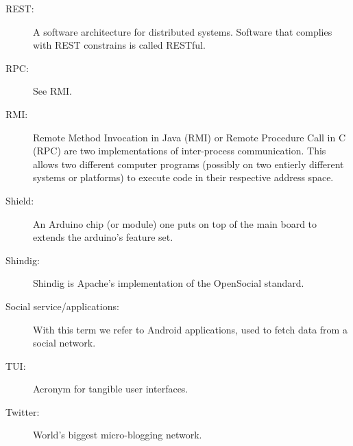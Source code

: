 \begin{description}
\item[REST:]
	A software architecture for distributed systems. Software that complies with REST constrains is called RESTful.
\item[RPC:]
	See RMI.
\item[RMI:]
	Remote Method Invocation in Java (RMI) or Remote Procedure Call in C (RPC) are two implementations of inter-process communication.
	This allows two different computer programs (possibly on two entierly different systems or platforms) to execute code in their respective
	address space.
\item[Shield:]
	An Arduino chip (or module) one puts on top of the main board to extends the arduino's feature set.
\item[Shindig:]
	Shindig is Apache's implementation of the OpenSocial standard.
\item[Social service/applications:]
	With this term we refer to Android applications, used to fetch data from a social network.
\item[TUI:]
	Acronym for tangible user interfaces.
\item[Twitter:]
	World's biggest micro-blogging network.
	
\end{description}
